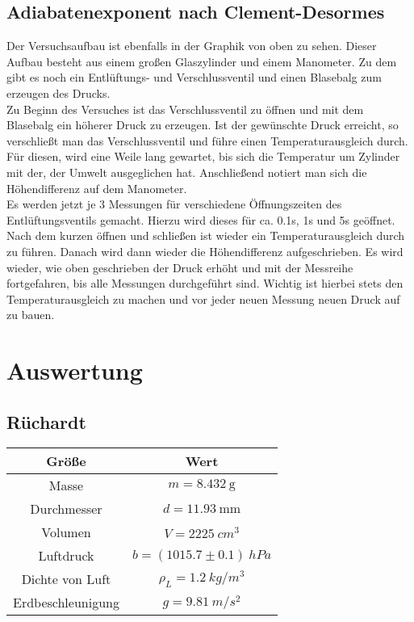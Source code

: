\documentclass[12pt,a4paper,titlepage,headinclude,bibtotoc]{scrartcl}
\begin{document}
\subsection{Adiabatenexponent nach Clement-Desormes}
Der Versuchsaufbau ist ebenfalls in der Graphik %
von oben zu sehen.
Dieser Aufbau besteht aus einem großen Glaszylinder und einem Manometer.
Zu dem gibt es noch ein Entlüftungs- und Verschlussventil und einen Blasebalg zum erzeugen des Drucks.\\
Zu Beginn des Versuches ist das Verschlussventil zu öffnen und mit dem Blasebalg ein höherer Druck zu erzeugen.
Ist der gewünschte Druck erreicht, so verschließt man das Verschlussventil und führe einen Temperaturausgleich durch.
Für diesen, wird eine Weile lang gewartet, bis sich die Temperatur um Zylinder mit der, der Umwelt ausgeglichen hat.
Anschließend notiert man sich die Höhendifferenz auf dem Manometer.\\
Es werden jetzt je 3 Messungen für verschiedene Öffnungszeiten des Entlüftungsventils gemacht.
Hierzu wird dieses für ca. 0.1s, 1s und 5s geöffnet.
Nach dem kurzen öffnen und schließen ist wieder ein Temperaturausgleich durch zu führen.
Danach wird dann wieder die Höhendifferenz aufgeschrieben.
Es wird wieder, wie oben geschrieben der Druck erhöht und mit der Messreihe fortgefahren, bis alle Messungen durchgeführt sind.
Wichtig ist hierbei stets den Temperaturausgleich zu machen und vor jeder neuen Messung neuen Druck auf zu bauen.

\section{Auswertung}
\label{sec:auswertung}
\subsection{Rüchardt}

\begin{table}[!hbt]
	\centering
	\begin{tabular}{|c|c|}
		\hline
		Größe & Wert\\
		\hline
		\hline
		Masse & $m = 8.432~\si{\gram}$\\
		Durchmesser & $d = 11.93~\si{\milli\meter}$\\
		Volumen & $V = 2225~\si{cm^3}$\\
		\hline
		Luftdruck & $b = (1015.7 \pm 0.1)~\si{hPa}$\\ 		
		\hline
		Dichte von Luft & $\rho_L = 1.2~\si{kg/m^3}$\\
		Erdbeschleunigung & $g = 9.81~\si{m/s^2}$\\		
		\hline
	\end{tabular}
\end{table}
\end{document}
